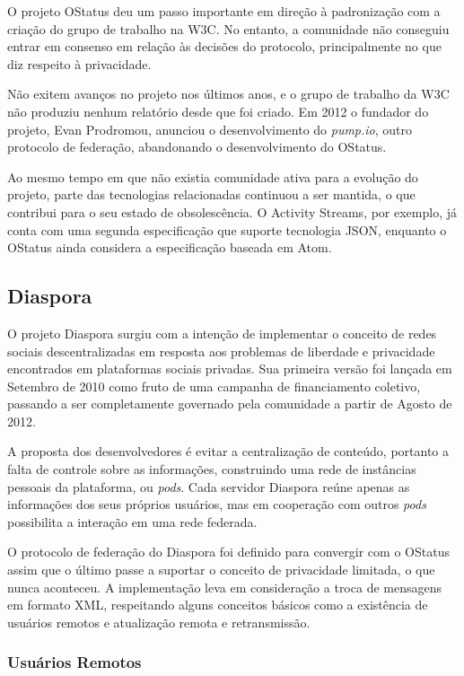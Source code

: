 O projeto OStatus deu um passo importante em direção à padronização com a criação do
grupo de trabalho na W3C. No entanto, a comunidade não conseguiu entrar em consenso
em relação às decisões do protocolo, principalmente no que diz respeito à
privacidade.

Não exitem avanços no projeto nos últimos anos, e o grupo de trabalho da W3C não
produziu nenhum relatório desde que foi criado. Em 2012 o fundador do projeto, Evan
Prodromou, anunciou o desenvolvimento do \textit{pump.io}, outro protocolo de
federação, abandonando o desenvolvimento do OStatus.

Ao mesmo tempo em que não existia comunidade ativa para a evolução do projeto, parte
das tecnologias relacionadas continuou a ser mantida, o que contribui para o seu
estado de obsolescência. O Activity Streams, por exemplo, já conta com uma segunda
especificação que suporte tecnologia JSON, enquanto o OStatus ainda considera a
especificação baseada em Atom.


\subsection{Diaspora}

O projeto Diaspora surgiu com a intenção de implementar o conceito de redes sociais
descentralizadas em resposta aos problemas de liberdade e privacidade encontrados em
plataformas sociais privadas. Sua primeira versão foi lançada em Setembro de 2010
como fruto de uma campanha de financiamento coletivo, passando a ser completamente
governado pela comunidade a partir de Agosto de 2012.

A proposta dos desenvolvedores é evitar a centralização de conteúdo, portanto a
falta de controle sobre as informações, construindo uma rede de instâncias pessoais
da plataforma, ou \textit{pods}. Cada servidor Diaspora reúne apenas as informações
dos seus próprios usuários, mas em cooperação com outros \textit{pods} possibilita a
interação em uma rede federada.

O protocolo de federação do Diaspora foi definido para convergir com o OStatus assim
que o último passe a suportar o conceito de privacidade limitada, o que nunca
aconteceu. A implementação leva em consideração a troca de mensagens em formato XML,
respeitando alguns conceitos básicos como a existência de usuários remotos e
atualização remota e retransmissão.

\subsubsection{Usuários Remotos}

